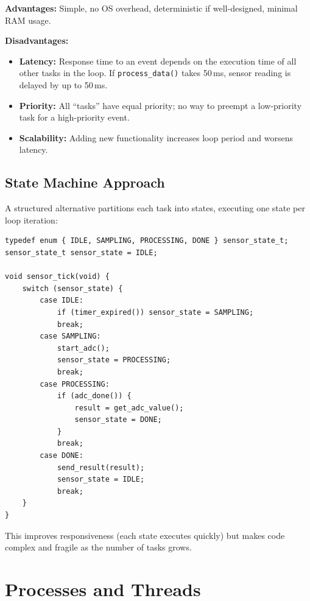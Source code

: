 \textbf{Advantages:} Simple, no OS overhead, deterministic if well-designed, minimal RAM usage.

\textbf{Disadvantages:}
\begin{itemize}[nosep]
  \item \textbf{Latency:} Response time to an event depends on the execution time of all other tasks in the loop. If \texttt{process\_data()} takes 50\,ms, sensor reading is delayed by up to 50\,ms.
  \item \textbf{Priority:} All ``tasks'' have equal priority; no way to preempt a low-priority task for a high-priority event.
  \item \textbf{Scalability:} Adding new functionality increases loop period and worsens latency.
\end{itemize}

\subsection{State Machine Approach}

A structured alternative partitions each task into states, executing one state per loop iteration:

\begin{lstlisting}[style=C, caption={State machine approach in super-loop.}]
typedef enum { IDLE, SAMPLING, PROCESSING, DONE } sensor_state_t;
sensor_state_t sensor_state = IDLE;

void sensor_tick(void) {
    switch (sensor_state) {
        case IDLE:
            if (timer_expired()) sensor_state = SAMPLING;
            break;
        case SAMPLING:
            start_adc();
            sensor_state = PROCESSING;
            break;
        case PROCESSING:
            if (adc_done()) {
                result = get_adc_value();
                sensor_state = DONE;
            }
            break;
        case DONE:
            send_result(result);
            sensor_state = IDLE;
            break;
    }
}
\end{lstlisting}

This improves responsiveness (each state executes quickly) but makes code complex and fragile as the number of tasks grows.

\section{Processes and Threads}
\label{sec:mt:threads}

